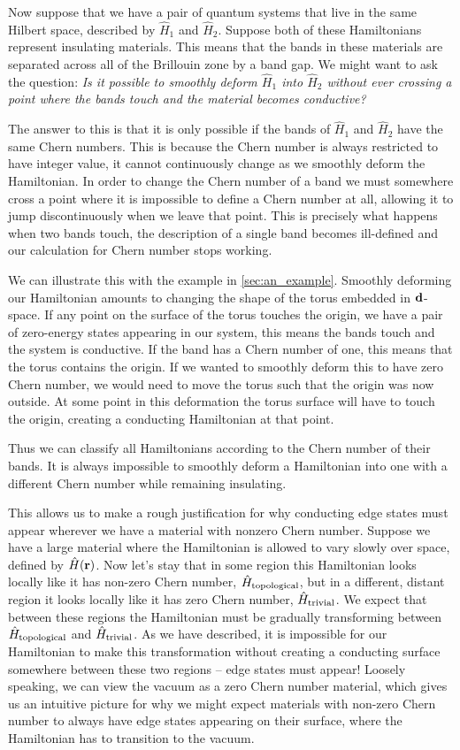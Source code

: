 Now suppose that we have a pair of quantum systems that live in the same Hilbert space, described by $\hat H_1$ and $\hat H_2$. Suppose both of these Hamiltonians represent insulating materials. This means that the bands in these materials are separated across all of the Brillouin zone by a band gap. We might want to ask the question: \textit{Is it possible to smoothly deform $\hat H _1$ into $\hat H_2$ without ever crossing a point where the bands touch and the material becomes conductive?} \par
The answer to this is that it is only possible if the bands of $\hat H_1$ and $\hat H_2$ have the same Chern numbers. This is because the Chern number is always restricted to have integer value, it cannot continuously change as we smoothly deform the Hamiltonian. In order to change the Chern number of a band we must somewhere cross a point where it is impossible to define a Chern number at all, allowing it to jump discontinuously when we leave that point. This is precisely what happens when two bands touch, the description of a single band becomes ill-defined and our calculation for Chern number stops working.\par
We can illustrate this with the example in \textsection\ref{sec:an_example}. Smoothly deforming our Hamiltonian amounts to changing the shape of the torus embedded in $\bf d$-space. If any point on the surface of the torus touches the origin, we have a pair of zero-energy states appearing in our system, this means the bands touch and the system is conductive. If the band has a Chern number of one, this means that the torus contains the origin. If we wanted to smoothly deform this to have zero Chern number, we would need to move the torus such that the origin was now outside. At some point in this deformation the torus surface will have to touch the origin, creating a conducting Hamiltonian at that point.\par
Thus we can classify all Hamiltonians according to the Chern number of their bands. It is always impossible to smoothly deform a Hamiltonian into one with a different Chern number while remaining insulating.\par
This allows us to make a rough justification for why conducting edge states must appear wherever we have a material with nonzero Chern number. Suppose we have a large material where the Hamiltonian is allowed to vary slowly over space, defined by $\hat H (\bf r)$. Now let's stay that in some region this Hamiltonian looks locally like it has non-zero Chern number, $\hat H _{\textup{topological}}$, but in a different, distant region it looks locally like it has zero Chern number, $\hat H _{\textup{trivial}}$. We expect that between these regions the Hamiltonian must be gradually transforming between $\hat H _{\textup{topological}}$ and $\hat H _{\textup{trivial}}$. As we have described, it is impossible for our Hamiltonian to make this transformation without creating a conducting surface somewhere between these two regions -- edge states must appear! Loosely speaking, we can view the vacuum as a zero Chern number material, which gives us an intuitive picture for why we might expect materials with non-zero Chern number to always have edge states appearing on their surface, where the Hamiltonian has to transition to the vacuum. 

